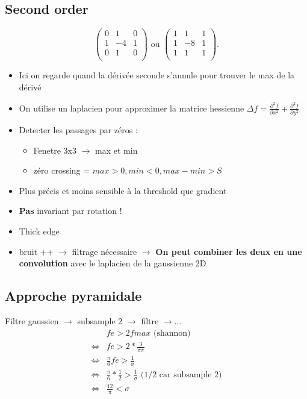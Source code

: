 \documentclass{article}
\theoremstyle{plain}%
\theoremstyle{definition}
\theoremstyle{remark}
\begin{document}
\subsection{Second order}

\[
    \begin{pmatrix}
        0 & 1 & 0 \\
        1 & -4 & 1 \\
        0 & 1 & 0 \\
    \end{pmatrix} \text{ ou } \begin{pmatrix}
        1 & 1 & 1 \\
        1 & -8 & 1 \\
        1 & 1 & 1 \\
    \end{pmatrix}
.\]
\begin{itemize}
    \item Ici on regarde quand la dérivée seconde s'annule pour trouver le max de la dérivé
    \item On utilise un laplacien pour approximer la matrice hessienne $ \Delta f = \frac{\partial ^2 f}{\partial x^2} + \frac{\partial ^2f}{\partial y^2} $ 
    \item Detecter les passages par zéros : \begin{itemize}
        \item Fenetre 3x3 $\rightarrow$ max et min
        \item zéro crossing = $max > 0, min < 0, max - min > S$
    \end{itemize}
    \item Plus précis et moins sensible à la threshold que gradient
    \item \textbf{Pas} invariant par rotation ! 
    \item Thick edge
    \item bruit ++ $\rightarrow$ filtrage nécessaire $\rightarrow$ \textbf{On peut combiner les deux en une convolution} avec le laplacien de la gaussienne 2D
\end{itemize}

\subsection{Approche pyramidale}
Filtre gaussien $\rightarrow$ subsample 2 $\rightarrow$ filtre $\rightarrow$...
\begin{align*}
    &fe > 2 fmax \text{ (shannon) } \\
    \Leftrightarrow& fe > 2 * \frac{3}{\sigma \pi } \\
    \Leftrightarrow& \frac{\pi }{6}fe > \frac{1}{\sigma } \\
    \Leftrightarrow& \frac{\pi}{6} * \frac{1}{2} > \frac{1}{\sigma } \text{ (1/2 car subsample 2)}\\
    \Leftrightarrow& \frac{12}{\pi } < \sigma 
\end{align*}
\end{document}
